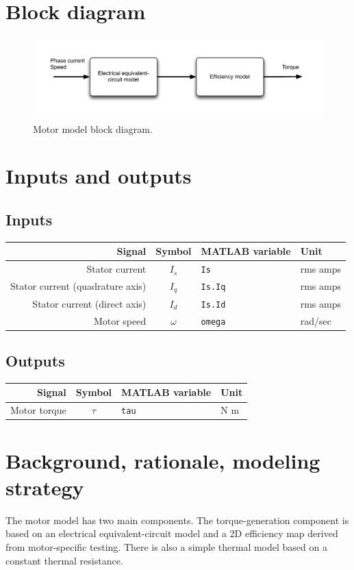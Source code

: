 \documentclass[../SimBALink.tex]{subfiles}
\begin{document}
\section{Block diagram}
	\begin{figure}[h]
			\centering
			\includegraphics[width=\linewidth]{../Model/Powertrain/Motor/Documentation/Figures/Motor_block_diagram}
			\caption{Motor model block diagram.}
	\end{figure}
	\FloatBarrier

\section{Inputs and outputs}
	\subsection{Inputs}
	\begin{tabular}{ r | c | l | l }
		Signal						&	Symbol				&	MATLAB variable	&	Unit						\\\hline	
		Stator current					&	$I_s$				&	\texttt{Is}			&	rms amps					\\
		Stator current (quadrature axis)	&	$I_q$				&	\texttt{Is.Iq}		&	rms amps			\\
		Stator current (direct axis)		&	$I_d$				&	\texttt{Is.Id}		&	rms amps			\\
		Motor speed					&	$\omega$			&	\texttt{omega}		&	rad/sec
	\end{tabular}
	
	\subsection{Outputs}
		\begin{tabular}{ r | c | l | l }
			Signal						&	Symbol				&	MATLAB variable	&	Unit						\\\hline	
			Motor torque					&	$\tau$				&	\texttt{tau}		&		N m				\\
		\end{tabular}
	
\section{Background, rationale, modeling strategy}
	The motor model has two main components. The torque-generation component is based on an electrical equivalent-circuit model and a 2D efficiency map derived from motor-specific testing. There is also a simple thermal model based on a constant thermal resistance.
	
\end{document}
